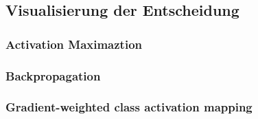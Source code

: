 \subsection{Visualisierung der Entscheidung} \label{sec:visAlgos}

\subsubsection{Activation Maximaztion} \label{sec:actMax}




\subsubsection{Backpropagation} \label{sec:backprop}



\subsubsection{Gradient-weighted class activation mapping}


